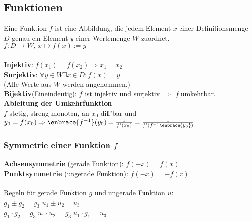 \documentclass[german]{latex4ei/latex4ei_sheet}
\begin{document}
\begin{sectionbox}
    \subsection{Funktionen}
    Eine Funktion $f$ ist eine Abbildung, die jedem Element $x$ einer Definitionsmenge $D$ genau ein Element $y$ einer Wertemenge $W$ zuordnet.\\
    $f:D\rightarrow W,\ x \mapsto f(x):=y$\\
    \\
    \textbf{Injektiv}: $f(x_1)=f(x_2) \Rightarrow x_1=x_2$\\
    \textbf{Surjektiv}: $\forall y\in W \exists x\in D:f(x)=y$\\ \quad (Alle Werte aus $W$ werden angenommen.)\\
    \textbf{Bijektiv}(Eineindeutig): $f$ ist injektiv und surjektiv $\Rightarrow$ $f$ umkehrbar. \\
    \textbf{Ableitung der Umkehrfunktion} \\
    $f$ stetig, streng monoton, an $x_0$ diff'bar und $y_0=f(x_0) \\
    \Rightarrow \enbrace{f^{-1}}(y_0)= \frac{1}{f'(x_0)} =\frac{1}{f'(f^{-1}\enbrace{y_0})}$
    
    \subsubsection{Symmetrie einer Funktion $f$}
    \textbf{Achsensymmetrie} (gerade Funktion): $f(-x)=f(x)$\\
    \textbf{Punktsymmetrie} (ungerade Funktion): $f(-x)=-f(x)$\\
    \\
    Regeln für gerade Funktion $g$ und ungerade Funktion $u$:\\
    $g_1 \pm g_2 = g_3$ \qquad $u_1 \pm u_2 = u_3$\\
    $g_1 \cdot g_2=g_3$ \qquad $u_1 \cdot u_2 = g_3$ \qquad $u_1 \cdot g_1=u_3$
    

\end{sectionbox}
\end{document}
